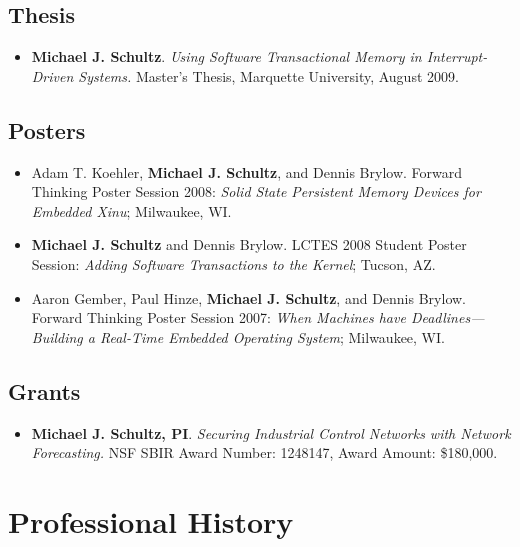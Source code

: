 \documentclass[12pt]{article}
\begin{document}
\subsection*{Thesis}
\begin{itemize}
    \item {\bf Michael J. Schultz}. {\em Using Software Transactional Memory in
    Interrupt-Driven Systems.}  Master's Thesis, Marquette University, August
    2009.
\end{itemize}

\subsection*{Posters}
\begin{itemize}
    \item Adam T. Koehler, {\bf Michael J. Schultz}, and Dennis Brylow. Forward
    Thinking Poster Session 2008: {\em Solid State Persistent Memory Devices for
    Embedded Xinu}; Milwaukee, WI.
    \item {\bf Michael J. Schultz} and Dennis Brylow.  LCTES 2008 Student Poster
    Session: {\em Adding Software Transactions to the Kernel}; Tucson, AZ.
    \item Aaron Gember, Paul Hinze, {\bf Michael J. Schultz}, and Dennis Brylow.
    Forward Thinking Poster Session 2007: {\em When Machines have
    Deadlines---Building a Real-Time Embedded Operating System}; Milwaukee, WI.
\end{itemize}

\subsection*{Grants}
\begin{itemize}
    \item {\bf Michael J. Schultz, PI}. {\em Securing Industrial Control
    Networks with Network Forecasting.} NSF SBIR Award Number: 1248147,
    Award Amount: \$180,000.
\end{itemize}

\section*{Professional History}
\end{document}
